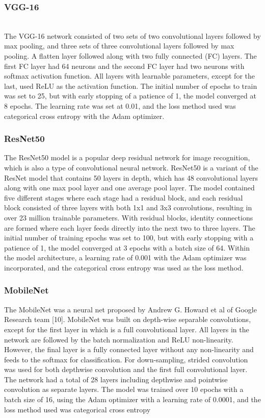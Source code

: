 \documentclass[conference]{IEEEtran}
\begin{document}
\subsubsection{VGG-16} \\
The VGG-16 network consisted of two sets of two convolutional layers followed by max pooling, and three sets of three convolutional layers followed by max pooling. A flatten layer followed along with two fully connected (FC) layers. The first FC layer had 64 neurons and the second FC layer had two neurons with softmax activation function. All layers with learnable parameters, except for the last, used ReLU as the activation function. The initial number of epochs to train was set to 25, but with early stopping of a patience of 1, the model converged at 8 epochs. The learning rate was set at 0.01, and the loss method used was categorical cross entropy with the Adam optimizer.
\subsubsection{ResNet50}
The ResNet50 model is a popular deep residual network for image recognition, which is also a type of convolutional neural network. ResNet50 is a variant of the ResNet model that contains 50 layers in depth, which has 48 convolutional layers along with one max pool layer and one average pool layer. The model contained five different stages where each stage had a residual block, and each residual block consisted of three layers with both 1x1 and 3x3 convolutions, resulting in over 23 million trainable parameters. With residual blocks, identity connections are formed where each layer feeds directly into the next two to three layers. The initial number of training epochs was set to 100, but with early stopping with a patience of 1, the model converged at 3 epochs with a batch size of 64. Within the model architecture, a learning rate of 0.001 with the Adam optimizer was incorporated, and the categorical cross entropy was used as the loss method.
\subsubsection{MobileNet}
The MobileNet was a neural net proposed by Andrew G. Howard et al of Google Research team [10]. MobileNet was built on depth-wise separable convolutions, except for the first layer in which is a full convolutional layer. All layers in the network are followed by the batch normalization and ReLU non-linearity. However, the final layer is a fully connected layer without any non-linearity and feeds to the softmax for classification. For down-sampling, strided convolution was used for both depthwise convolution and the first full convolutional layer. The network had a total of 28 layers including depthwise and pointwise convolution as separate layers. The model was trained over 10 epochs with a batch size of 16, using the Adam optimizer with a learning rate of 0.0001, and the loss method used was categorical cross entropy
\end{document}

